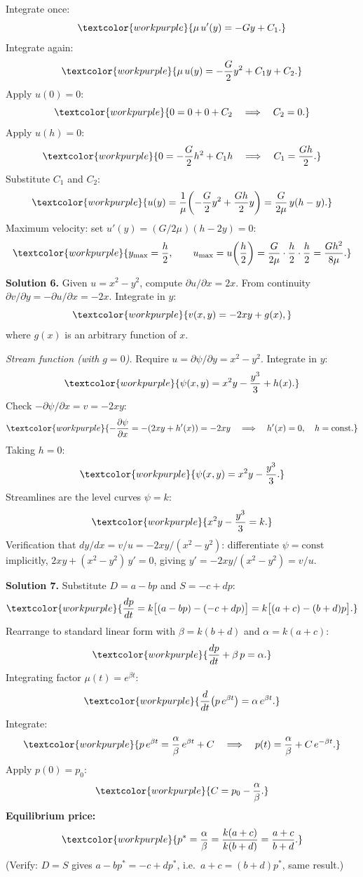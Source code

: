 Integrate once:
\[
  \textcolor{workpurple}{\mu\,u'(y) = -Gy + C_1.}
\]
Integrate again:
\[
  \textcolor{workpurple}{\mu\,u(y) = -\frac{G}{2}y^2 + C_1 y + C_2.}
\]
Apply $u(0) = 0$:
\[
  \textcolor{workpurple}{0 = 0 + 0 + C_2 \quad\Longrightarrow\quad C_2 = 0.}
\]
Apply $u(h) = 0$:
\[
  \textcolor{workpurple}{0 = -\frac{G}{2}h^2 + C_1 h
  \quad\Longrightarrow\quad C_1 = \frac{Gh}{2}.}
\]
Substitute $C_1$ and $C_2$:
\[
  \textcolor{workpurple}{u(y) = \frac{1}{\mu}\!\left(-\frac{G}{2}y^2 + \frac{Gh}{2}y\right)
  = \frac{G}{2\mu}\,y(h - y).}
\]
Maximum velocity: set $u'(y) = (G/2\mu)(h - 2y) = 0$:
\[
  \textcolor{workpurple}{y_{\max} = \frac{h}{2},
  \qquad
  u_{\max} = u\!\left(\frac{h}{2}\right)
  = \frac{G}{2\mu}\cdot\frac{h}{2}\cdot\frac{h}{2}
  = \frac{Gh^2}{8\mu}.}
\]

\medskip

\noindent\textbf{Solution 6.}\quad
Given $u = x^2 - y^2$, compute $\partial u/\partial x = 2x$.
From continuity $\partial v/\partial y = -\partial u/\partial x = -2x$.
Integrate in $y$:
\[
  \textcolor{workpurple}{v(x,y) = -2xy + g(x),}
\]
where $g(x)$ is an arbitrary function of $x$.

\textit{Stream function (with $g = 0$).}
Require $u = \partial\psi/\partial y = x^2 - y^2$.
Integrate in $y$:
\[
  \textcolor{workpurple}{\psi(x,y) = x^2 y - \frac{y^3}{3} + h(x).}
\]
Check $-\partial\psi/\partial x = v = -2xy$:
\[
  \textcolor{workpurple}{-\frac{\partial\psi}{\partial x}
  = -(2xy + h'(x)) = -2xy
  \quad\Longrightarrow\quad h'(x) = 0,\quad h = \text{const}.}
\]
Taking $h = 0$:
\[
  \textcolor{workpurple}{\psi(x,y) = x^2 y - \frac{y^3}{3}.}
\]
Streamlines are the level curves $\psi = k$:
\[
  \textcolor{workpurple}{x^2 y - \frac{y^3}{3} = k.}
\]
Verification that $dy/dx = v/u = -2xy/(x^2 - y^2)$: differentiate
$\psi = \text{const}$ implicitly,
$2xy + (x^2 - y^2)\,y' = 0$, giving $y' = -2xy/(x^2 - y^2) = v/u$. \checkmark

\medskip

\noindent\textbf{Solution 7.}\quad
Substitute $D = a - bp$ and $S = -c + dp$:
\[
  \textcolor{workpurple}{\frac{dp}{dt}
  = k\bigl[(a - bp) - (-c + dp)\bigr]
  = k\bigl[(a + c) - (b + d)p\bigr].}
\]
Rearrange to standard linear form with $\beta = k(b+d)$ and
$\alpha = k(a+c)$:
\[
  \textcolor{workpurple}{\frac{dp}{dt} + \beta\,p = \alpha.}
\]
Integrating factor $\mu(t) = e^{\beta t}$:
\[
  \textcolor{workpurple}{\frac{d}{dt}\!\left(p\,e^{\beta t}\right) = \alpha\,e^{\beta t}.}
\]
Integrate:
\[
  \textcolor{workpurple}{p\,e^{\beta t} = \frac{\alpha}{\beta}\,e^{\beta t} + C
  \quad\Longrightarrow\quad p(t) = \frac{\alpha}{\beta} + C\,e^{-\beta t}.}
\]
Apply $p(0) = p_0$:
\[
  \textcolor{workpurple}{C = p_0 - \frac{\alpha}{\beta}.}
\]
\textbf{Equilibrium price:}
\[
  \textcolor{workpurple}{p^* = \frac{\alpha}{\beta}
  = \frac{k(a+c)}{k(b+d)} = \frac{a+c}{b+d}.}
\]
(Verify: $D = S$ gives $a - bp^* = -c + dp^*$, i.e.\ $a + c = (b+d)p^*$,
same result.)

